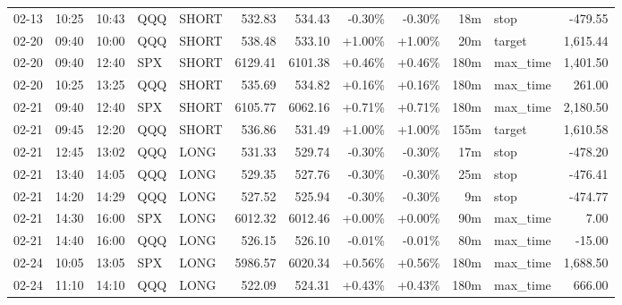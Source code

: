 \documentclass[11pt,a4paper,twoside]{article}
\begin{document}
\begin{center}
\begin{longtable}{>{\color{txtmain}}l l l l l r r r r r >{\color{txtmain}}l r}
02-13 & 10:25 & 10:43 & QQQ & SHORT & 532.83 & 534.43 & \textcolor{lossred}{-0.30\%} & \textcolor{lossred}{-0.30\%} & 18m & stop & \textcolor{lossred}{-479.55} \\
02-20 & 09:40 & 10:00 & QQQ & SHORT & 538.48 & 533.10 & \textcolor{wingreen}{+1.00\%} & \textcolor{wingreen}{+1.00\%} & 20m & target & \textcolor{wingreen}{1,615.44} \\
02-20 & 09:40 & 12:40 & SPX & SHORT & 6129.41 & 6101.38 & \textcolor{wingreen}{+0.46\%} & \textcolor{wingreen}{+0.46\%} & 180m & max\_time & \textcolor{wingreen}{1,401.50} \\
02-20 & 10:25 & 13:25 & QQQ & SHORT & 535.69 & 534.82 & \textcolor{wingreen}{+0.16\%} & \textcolor{wingreen}{+0.16\%} & 180m & max\_time & \textcolor{wingreen}{261.00} \\
02-21 & 09:40 & 12:40 & SPX & SHORT & 6105.77 & 6062.16 & \textcolor{wingreen}{+0.71\%} & \textcolor{wingreen}{+0.71\%} & 180m & max\_time & \textcolor{wingreen}{2,180.50} \\
02-21 & 09:45 & 12:20 & QQQ & SHORT & 536.86 & 531.49 & \textcolor{wingreen}{+1.00\%} & \textcolor{wingreen}{+1.00\%} & 155m & target & \textcolor{wingreen}{1,610.58} \\
02-21 & 12:45 & 13:02 & QQQ & LONG & 531.33 & 529.74 & \textcolor{lossred}{-0.30\%} & \textcolor{lossred}{-0.30\%} & 17m & stop & \textcolor{lossred}{-478.20} \\
02-21 & 13:40 & 14:05 & QQQ & LONG & 529.35 & 527.76 & \textcolor{lossred}{-0.30\%} & \textcolor{lossred}{-0.30\%} & 25m & stop & \textcolor{lossred}{-476.41} \\
02-21 & 14:20 & 14:29 & QQQ & LONG & 527.52 & 525.94 & \textcolor{lossred}{-0.30\%} & \textcolor{lossred}{-0.30\%} & 9m & stop & \textcolor{lossred}{-474.77} \\
02-21 & 14:30 & 16:00 & SPX & LONG & 6012.32 & 6012.46 & \textcolor{wingreen}{+0.00\%} & \textcolor{wingreen}{+0.00\%} & 90m & max\_time & \textcolor{wingreen}{7.00} \\
02-21 & 14:40 & 16:00 & QQQ & LONG & 526.15 & 526.10 & \textcolor{lossred}{-0.01\%} & \textcolor{lossred}{-0.01\%} & 80m & max\_time & \textcolor{lossred}{-15.00} \\
02-24 & 10:05 & 13:05 & SPX & LONG & 5986.57 & 6020.34 & \textcolor{wingreen}{+0.56\%} & \textcolor{wingreen}{+0.56\%} & 180m & max\_time & \textcolor{wingreen}{1,688.50} \\
02-24 & 11:10 & 14:10 & QQQ & LONG & 522.09 & 524.31 & \textcolor{wingreen}{+0.43\%} & \textcolor{wingreen}{+0.43\%} & 180m & max\_time & \textcolor{wingreen}{666.00} \\

\end{longtable}
\end{center}
\end{document}
